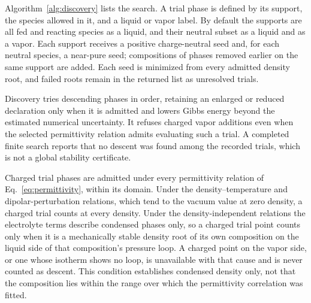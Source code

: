 Algorithm~\ref{alg:discovery} lists the search.
A trial phase is defined by its support, the species allowed in it, and a liquid or vapor label.
By default the supports are all fed and reacting species as a liquid, and their neutral subset as a liquid and as a vapor.
Each support receives a positive charge-neutral seed and, for each neutral species, a near-pure seed; compositions of phases removed earlier on the same support are added.
Each seed is minimized from every admitted density root, and failed roots remain in the returned list as unresolved trials.

Discovery tries descending phases in order, retaining an enlarged or reduced declaration only when it is admitted and lowers Gibbs energy beyond the estimated numerical uncertainty.
It refuses charged vapor additions even when the selected permittivity relation admits evaluating such a trial.
A completed finite search reports that no descent was found among the recorded trials, which is not a global stability certificate.

Charged trial phases are admitted under every permittivity relation of Eq.~\eqref{eq:permittivity}, within its domain.
Under the density--temperature and dipolar-perturbation relations, which tend to the vacuum value at zero density, a charged trial counts at every density.
Under the density-independent relations the electrolyte terms describe condensed phases only, so a charged trial point counts only when it is a mechanically stable density root of its own composition on the liquid side of that composition's pressure loop.
A charged point on the vapor side, or one whose isotherm shows no loop, is unavailable with that cause and is never counted as descent.
This condition establishes condensed density only, not that the composition lies within the range over which the permittivity correlation was fitted.

